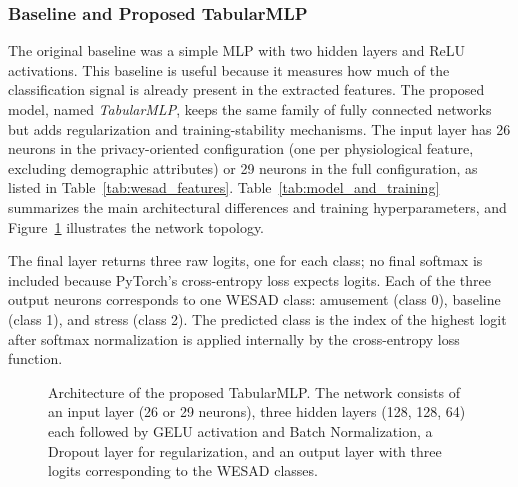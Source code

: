\documentclass[12pt]{article}
\begin{document}
\subsubsection{Baseline and Proposed TabularMLP}

The original baseline was a simple MLP with two hidden layers and ReLU activations. This baseline is useful because it measures how much of the classification signal is already present in the extracted features. The proposed model, named \textit{TabularMLP}, keeps the same family of fully connected networks but adds regularization and training-stability mechanisms. The input layer has 26 neurons in the privacy-oriented configuration (one per physiological feature, excluding demographic attributes) or 29 neurons in the full configuration, as listed in Table~\ref{tab:wesad_features}. Table~\ref{tab:model_and_training} summarizes the main architectural differences and training hyperparameters, and Figure~\ref{fig:mlp_architecture} illustrates the network topology.

The final layer returns three raw logits, one for each class; no final softmax is included because PyTorch's cross-entropy loss expects logits. Each of the three output neurons corresponds to one WESAD class: amusement (class 0), baseline (class 1), and stress (class 2). The predicted class is the index of the highest logit after softmax normalization is applied internally by the cross-entropy loss function.

\begin{figure}[htbp]
\centering
{}
\caption{Architecture of the proposed TabularMLP. The network consists of an input layer (26 or 29 neurons), three hidden layers (128, 128, 64) each followed by GELU activation and Batch Normalization, a Dropout layer for regularization, and an output layer with three logits corresponding to the WESAD classes.}
\label{fig:mlp_architecture}
\end{figure}
\end{document}
